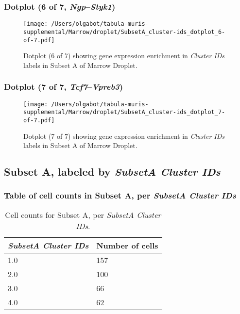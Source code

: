\clearpage

\subsubsection{Dotplot (6 of 7, \emph{Ngp}--\emph{Styk1})}
\begin{figure}[h]
\centering
\texttt{[image: /Users/olgabot/tabula-muris-supplemental/Marrow/droplet/SubsetA\_cluster-ids\_dotplot\_6-of-7.pdf]}

\caption{ Dotplot (6 of 7)  showing gene expression enrichment in \emph{Cluster IDs} labels in Subset A of Marrow Droplet. }
\end{figure}


\clearpage

\subsubsection{Dotplot (7 of 7, \emph{Tcf7}--\emph{Vpreb3})}
\begin{figure}[h]
\centering
\texttt{[image: /Users/olgabot/tabula-muris-supplemental/Marrow/droplet/SubsetA\_cluster-ids\_dotplot\_7-of-7.pdf]}

\caption{ Dotplot (7 of 7)  showing gene expression enrichment in \emph{Cluster IDs} labels in Subset A of Marrow Droplet. }
\end{figure}


\clearpage

\subsection{Subset A, labeled by \emph{SubsetA Cluster IDs}}
\subsubsection{Table of cell counts in Subset A, per \emph{SubsetA Cluster IDs}}\begin{table}[h]
\centering
\label{my-label}
\begin{tabular}{@{}ll@{}}
\toprule

\emph{SubsetA Cluster IDs}& Number of cells \\ \midrule
1.0 & 157 \\

2.0 & 100 \\

3.0 & 66 \\

4.0 & 62 \\
\bottomrule
\end{tabular}
\caption{Cell counts for Subset A, per \emph{SubsetA Cluster IDs}.}
\end{table}

